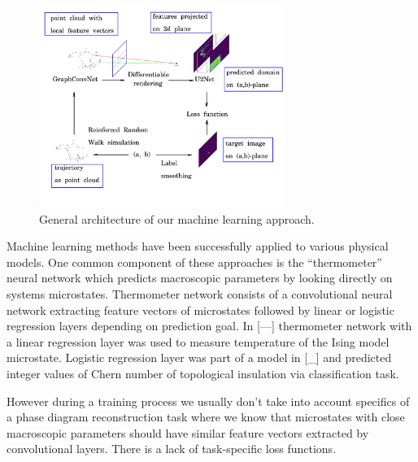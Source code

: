 \documentclass[aps,a4paper,twocolumn,showpacs]{revtex4}
\begin{document}
\begin{figure}[ht]
\includegraphics[width=8cm]{Fig1_rrw_analysis_scheme.png}
\caption{General architecture of our machine learning approach.}
\label{scheme}
\end{figure}

Machine learning methods have been successfully applied to various physical models. One common component of these approaches is the “thermometer” neural network which predicts macroscopic parameters by looking directly on systems microstates. Thermometer network consists of a convolutional neural network extracting feature vectors of microstates followed by linear or logistic regression layers depending on prediction goal. In [---] thermometer network with a linear regression layer was used to measure temperature of the Ising model microstate. Logistic regression layer was part of a model in [_] and predicted integer values of Chern number of topological insulation via classification task.

However during a training process we usually don’t take into account specifics of a phase diagram reconstruction task where we know that microstates with close macroscopic parameters should have similar feature vectors extracted by convolutional layers. There is a lack of task-specific loss functions.
\end{document}
